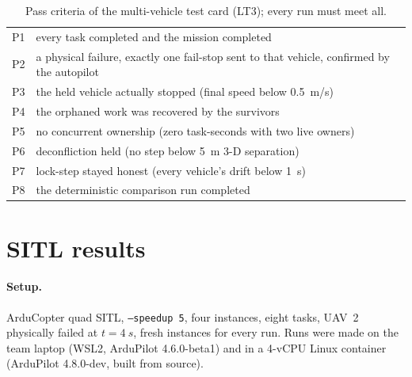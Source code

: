 \documentclass[a4paper,11pt]{article}
\newcommand{\code}[1]{\texttt{\codebreaks#1\endcodebreaks}}
\def\codebreaks{\begingroup\def\_{\textunderscore\allowbreak}\def\/{/\allowbreak}}
\def\endcodebreaks{\endgroup}
\begin{document}
\begin{table}[t]
\centering\small
\caption{Pass criteria of the multi-vehicle test card (LT3); every run must meet all.}
\label{tab:card}
\begin{tabularx}{\linewidth}{@{}lX@{}}
\toprule
P1 & every task completed and the mission completed \\
P2 & a physical failure, exactly one fail-stop sent to that vehicle, confirmed by the autopilot \\
P3 & the held vehicle actually stopped (final speed below \SI{0.5}{m/s}) \\
P4 & the orphaned work was recovered by the survivors \\
P5 & no concurrent ownership (zero task-seconds with two live owners) \\
P6 & deconfliction held (no step below \SI{5}{m} 3-D separation) \\
P7 & lock-step stayed honest (every vehicle's drift below \SI{1}{s}) \\
P8 & the deterministic comparison run completed \\
\bottomrule
\end{tabularx}
\end{table}

\section{SITL results}\label{sec:results}

\paragraph{Setup.} ArduCopter quad SITL, \code{--speedup 5}, four instances,
eight tasks, UAV~2 physically failed at $t=\SI{4}{s}$, fresh instances for every
run. Runs were made on the team laptop (WSL2, ArduPilot 4.6.0-beta1) and in a
4-vCPU Linux container (ArduPilot 4.8.0-dev, built from source).
\end{document}

